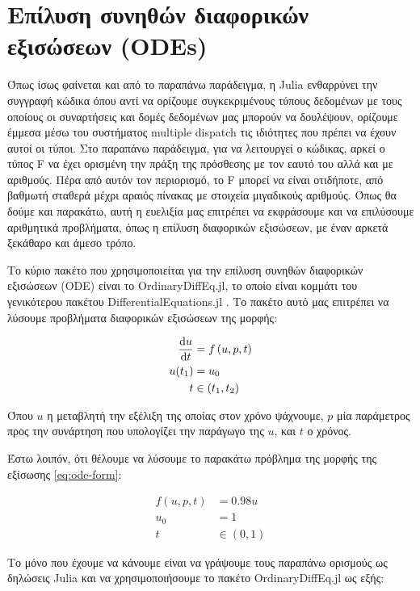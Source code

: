\section{Επίλυση συνηθών διαφορικών εξισώσεων (ODEs)}

Όπως ίσως φαίνεται και από το παραπάνω παράδειγμα, η Julia ενθαρρύνει την συγγραφή κώδικα όπου αντί να ορίζουμε συγκεκριμένους τύπους δεδομένων με τους οποίους οι συναρτήσεις και δομές δεδομένων μας μπορούν να δουλέψουν, ορίζουμε έμμεσα μέσω του συστήματος multiple dispatch τις ιδιότητες που πρέπει να έχουν αυτοί οι τύποι.
Στο παραπάνω παράδειγμα, για να λειτουργεί ο κώδικας, αρκεί ο τύπος F να έχει ορισμένη την πράξη της πρόσθεσης με τον εαυτό του αλλά και με αριθμούς.
Πέρα από αυτόν τον περιορισμό, το F μπορεί να είναι οτιδήποτε, από βαθμωτή σταθερά μέχρι αραιός πίνακας με στοιχεία μιγαδικούς αριθμούς.
Όπως θα δούμε και παρακάτω, αυτή η ευελιξία μας επιτρέπει να εκφράσουμε και να επιλύσουμε αριθμητικά προβλήματα, όπως η επίλυση διαφορικών εξισώσεων, με έναν αρκετά ξεκάθαρο και άμεσο τρόπο.

Το κύριο πακέτο που χρησιμοποιείται για την επίλυση συνηθών διαφορικών εξισώσεων (ODE) είναι το OrdinaryDiffEq.jl, το οποίο είναι κομμάτι του γενικότερου πακέτου DifferentialEquations.jl \cite{Rackauckas2017}.
Το πακέτο αυτό μας επιτρέπει να λύσουμε προβλήματα διαφορικών εξισώσεων της μορφής:

\begin{align}
    \label{eq:ode-form}
    \frac{\mathrm{d}u}{\mathrm{d}t} &= f \left( u, p, t \right) \\
    u(t_1) &= u_0 \notag \\
    t &\in \left(t_1, t_2\right) \notag
\end{align}

Όπου $u$ η μεταβλητή την εξέλιξη της οποίας στον χρόνο ψάχνουμε, $p$ μία παράμετρος προς την συνάρτηση που υπολογίζει την παράγωγο της $u$, και $t$ ο χρόνος.

Έστω λοιπόν, ότι θέλουμε να λύσουμε το παρακάτω πρόβλημα της μορφής της εξίσωσης \eqref{eq:ode-form}:

\begin{align*}
    f(u, p, t) &= 0.98u \\
    u_0 &= 1 \\
    t &\in (0, 1)
\end{align*}

Το μόνο που έχουμε να κάνουμε είναι να γράψουμε τους παραπάνω ορισμούς ως δηλώσεις Julia και να χρησιμοποιήσουμε το πακέτο OrdinaryDiffEq.jl ως εξής:

